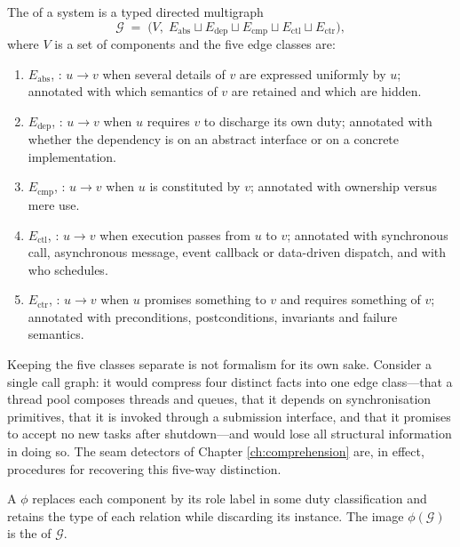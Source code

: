 \begin{definition}\label{def:relgraph}
The  of a system is a typed directed multigraph
\begin{equation}\label{eq:relgraph}
\mathcal{G} \;=\; \bigl(V,\; E_{\mathrm{abs}} \sqcup E_{\mathrm{dep}} \sqcup
E_{\mathrm{cmp}} \sqcup E_{\mathrm{ctl}} \sqcup E_{\mathrm{ctr}}\bigr),
\end{equation}
where $V$ is a set of components and the five edge classes are:
\begin{enumerate}[label=(\alph*)]
\item $E_{\mathrm{abs}}$, : $u \to v$ when several details of $v$ are
      expressed uniformly by $u$; annotated with which semantics of $v$ are retained and
      which are hidden.
\item $E_{\mathrm{dep}}$, : $u \to v$ when $u$ requires $v$ to discharge
      its own duty; annotated with whether the dependency is on an abstract interface or on
      a concrete implementation.
\item $E_{\mathrm{cmp}}$, : $u \to v$ when $u$ is constituted by $v$;
      annotated with ownership versus mere use.
\item $E_{\mathrm{ctl}}$, : $u \to v$ when execution passes from $u$ to $v$;
      annotated with synchronous call, asynchronous message, event callback or data-driven
      dispatch, and with who schedules.
\item $E_{\mathrm{ctr}}$, : $u \to v$ when $u$ promises something to $v$ and
      requires something of $v$; annotated with preconditions, postconditions, invariants
      and failure semantics.
\end{enumerate}
\end{definition}

Keeping the five classes separate is not formalism for its own sake. Consider a single
call graph: it would compress four distinct facts into one edge class---that a thread pool
composes threads and queues, that it depends on synchronisation primitives, that it is
invoked through a submission interface, and that it promises to accept no new tasks after
shutdown---and would lose all structural information in doing so. The seam detectors of
Chapter \ref{ch:comprehension} are, in effect, procedures for recovering this five-way
distinction.

\begin{definition}\label{def:skeleton}
A  $\phi$ replaces each component by its role label in some duty
classification and retains the type of each relation while discarding its instance. The
image $\phi(\mathcal{G})$ is the  of $\mathcal{G}$.
\end{definition}

